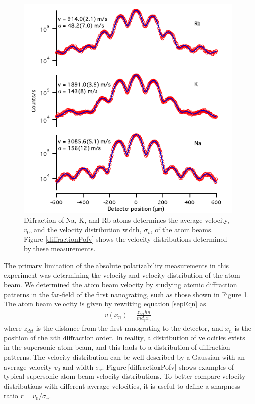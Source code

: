 \begin{figure}
\includegraphics[width=1\textwidth]{Figures/Fig3Diffraction2.pdf}
\caption[Diffraction of Na, K, and Rb.]{\label{nakrbDiffraction} Diffraction of Na, K, and Rb atoms determines the average velocity, $v_0$, and the velocity distribution width, $\sigma_v$, of the atom beams. Figure \ref{diffractionPofv} shows the velocity distributions determined by these measurements.}
\end{figure}



The primary limitation of the absolute polarizability measurements in this experiment was determining the velocity and velocity distribution of the atom beam. We determined the atom beam velocity by studying atomic diffraction patterns in the far-field of the first nanograting, such as those shown in Figure \ref{nakrbDiffraction}. The atom beam velocity is given by rewriting equation \ref{sepEqn} as
\begin{eqnarray}
v(x_n)=\frac{z_{det}hn}{md_gx_n}
\end{eqnarray}
where $z_{det}$ is the distance from the first nanograting to the detector, and $x_n$ is the position of the $n$th diffraction order. In reality, a distribution of velocities exists in the supersonic atom beam, and this leads to a distribution of diffraction patterns. The velocity distribution can be well described by a Gaussian with an average velocity $v_0$ and width $\sigma_v$. Figure \ref{diffractionPofv} shows examples of typical supersonic atom beam velocity distributions. To better compare velocity distributions with different average velocities, it is useful to define a sharpness ratio $r=v_0/\sigma_v$. 




